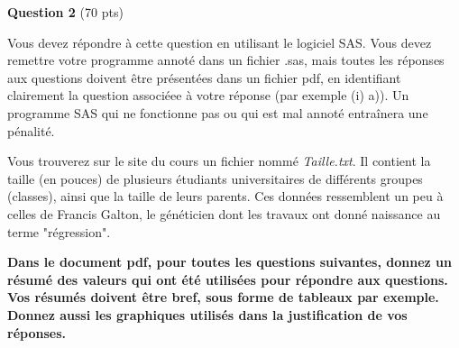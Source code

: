 \documentclass[letter, 11pt]{article}
\begin{document}
\vspace{0.1in}

\vspace{0.1 in}
\textbf{Question 2} (70 pts)
\vspace{0.1in}

Vous devez répondre à cette question en utilisant le logiciel SAS. Vous devez remettre votre programme annoté dans un fichier .sas, mais toutes les réponses aux questions doivent être présentées dans un fichier pdf, en identifiant clairement la question associéee à votre réponse (par exemple (i)
a)). Un programme SAS qui ne fonctionne pas ou qui est mal annoté entraînera une pénalité.
\vspace{0.1in}

Vous trouverez sur le site du cours un fichier nommé {\it Taille.txt}. Il contient la taille (en pouces) de plusieurs étudiants universitaires de différents groupes (classes), ainsi que la taille de leurs parents. Ces données ressemblent un peu à celles de Francis Galton, le généticien dont les travaux ont donné naissance au terme "régression". 
\vspace{0.1in}

{\bf Dans le document pdf, pour toutes les questions suivantes, donnez un résumé des valeurs qui ont été utilisées pour répondre aux questions. Vos résumés doivent être bref, sous forme de tableaux par exemple. Donnez aussi les graphiques utilisés dans la justification de vos réponses.}
\end{document}
